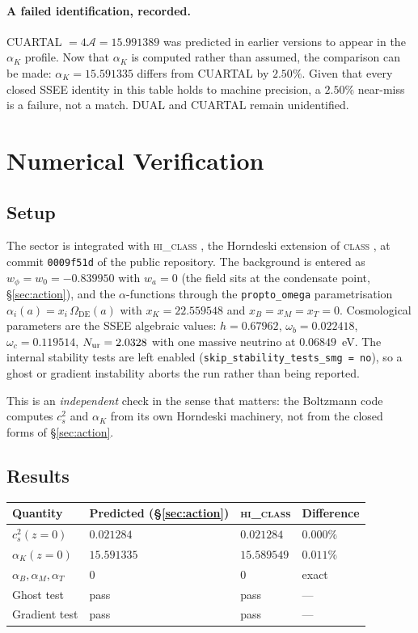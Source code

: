 \documentclass[12pt,a4paper]{article}
\newcommand{\AURA}{\mathcal{A}}
\newcommand{\Omde}{\Omega_{\mathrm{DE}}}
\begin{document}
\paragraph{A failed identification, recorded.}
CUARTAL $= 4\AURA = 15.991389$ was predicted in earlier versions to
appear in the $\alpha_K$ profile.  Now that $\alpha_K$ is computed rather
than assumed, the comparison can be made: $\alpha_K = 15.591335$ differs
from CUARTAL by $2.50\%$.  Given that every closed SSEE identity in this
table holds to machine precision, a $2.50\%$ near-miss is a failure, not
a match.  DUAL and CUARTAL remain unidentified.
\section{Numerical Verification}
\label{sec:numerics}

\subsection{Setup}

The sector is integrated with \textsc{hi\_class} \citep{hiclass2017},
the Horndeski extension of \textsc{class} \citep{Blas2011}, at commit
\texttt{0009f51d} of the public repository.  The background is entered
as $w_\phi = w_0 = -0.839950$ with $w_a = 0$ (the field sits at the
condensate point, §\ref{sec:action}), and the $\alpha$-functions through
the \texttt{propto\_omega} parametrisation
$\alpha_i(a) = x_i\,\Omde(a)$ with
$x_K = 22.559548$ and $x_B = x_M = x_T = 0$.
Cosmological parameters are the SSEE algebraic values:
$h = 0.67962$, $\omega_b = 0.022418$, $\omega_c = 0.119514$,
$N_{\rm ur} = 2.0328$ with one massive neutrino at $0.06849$~eV.
The internal stability tests are left enabled
(\texttt{skip\_stability\_tests\_smg = no}), so a ghost or gradient
instability aborts the run rather than being reported.

This is an \emph{independent} check in the sense that matters: the
Boltzmann code computes $c_s^2$ and $\alpha_K$ from its own Horndeski
machinery, not from the closed forms of §\ref{sec:action}.

\subsection{Results}

\begin{center}
\begin{tabular}{llll}
\toprule
Quantity & Predicted (§\ref{sec:action}) & \textsc{hi\_class} & Difference \\
\midrule
$c_s^2(z{=}0)$      & $0.021284$  & $0.021284$  & $0.000\%$ \\
$\alpha_K(z{=}0)$   & $15.591335$ & $15.589549$ & $0.011\%$ \\
$\alpha_B,\alpha_M,\alpha_T$ & $0$ & $0$ & exact \\
Ghost test          & pass & pass & — \\
Gradient test       & pass & pass & — \\
\bottomrule
\end{tabular}
\end{center}
\end{document}
